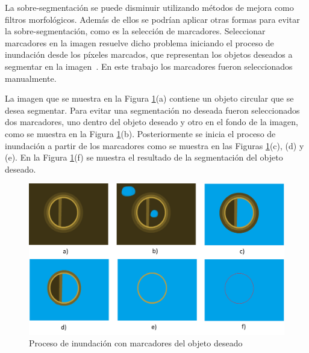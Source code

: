 La sobre-segmentación se puede disminuir utilizando métodos de mejora como filtros morfológicos. Además de ellos se podrían aplicar otras formas para evitar la sobre-segmentación, como es la selección de marcadores. Seleccionar marcadores en la imagen resuelve dicho problema iniciando el proceso de inundación desde los píxeles marcados, que representan los objetos deseados a segmentar en la imagen~\cite{Yang}. En este trabajo los marcadores fueron seleccionados manualmente.

La imagen que se muestra en la Figura \ref{img:relieve1}(a) contiene un objeto circular que se desea segmentar. Para evitar una segmentación no deseada fueron seleccionados dos marcadores, uno dentro del objeto deseado y otro en el fondo de la imagen, como se muestra en la Figura \ref{img:relieve1}(b). Posteriormente se inicia el proceso de inundación a partir de los marcadores como se muestra en las Figuras \ref{img:relieve1}(c), (d) y (e). En la Figura \ref{img:relieve1}(f) se muestra el resultado de la segmentación del objeto deseado.


\begin{figure}[H]
\centering
\includegraphics[width=140mm]{./imagenes/con_marcadores.png}
\caption{Proceso de inundación con marcadores del objeto deseado}
\label{img:relieve1}
\end{figure}

